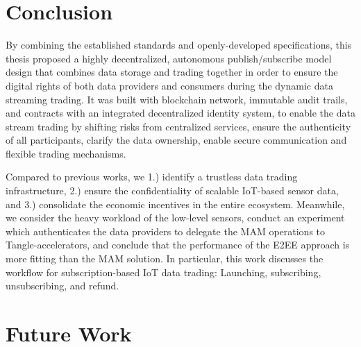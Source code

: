 \clearpage
{}

\newpage
{}
\chapter{Conclusion}
\label{section:conclusion}
\pagestyle{plain}

\begin{spacing}{2.0}

By combining the established standards and openly-developed specifications, this thesis proposed a highly decentralized, autonomous publish/subscribe model design that combines data storage and trading together in order to ensure the digital rights of both data providers and consumers during the dynamic data streaming trading. It was built with blockchain network, immutable audit trails, and contracts with an integrated decentralized identity system, to enable the data stream trading by shifting risks from centralized services, ensure the authenticity of all participants, clarify the data ownership, enable secure communication and flexible trading mechanisms.

Compared to previous works, we 1.) identify a trustless data trading infrastructure, 2.) ensure the confidentiality of scalable IoT-based sensor data, and 3.) consolidate the economic incentives in the entire ecosystem. Meanwhile, we consider the heavy workload of the low-level sensors, conduct an experiment which authenticates the data providers to delegate the MAM operations to Tangle-accelerators, and conclude that the performance of the E2EE approach is more fitting than the MAM solution. In particular, this work discusses the workflow for subscription-based IoT data trading: Launching, subscribing, unsubscribing, and refund.

\end{spacing}

\clearpage
{}

\newpage
{}
\chapter{Future Work}
\label{section:future_work}
\pagestyle{plain}

